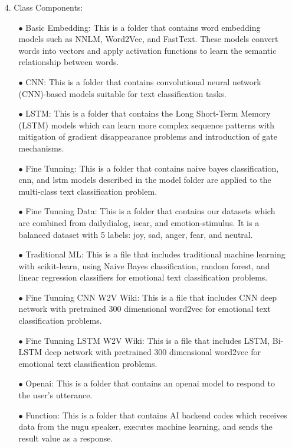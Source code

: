 \documentclass[conference]{IEEEtran}
\begin{document}
\begin{itemize}
\begin{table} [h]
\begin{tabular}{p{3cm}|p{3.5cm}|p{2cm}}
    \hline
    \end{tabular} 
\end{table}
    
    
    
    \item[4.]  Class Components: 
    \begin{itemize}
        \item[$\bullet$]Basic Embedding: This is a folder that contains word embedding models such as NNLM, Word2Vec, and FastText. These models convert words into vectors and apply activation functions to learn the semantic relationship between words.
        \item[$\bullet$]CNN: This is a folder that contains convolutional neural network (CNN)-based models suitable for text classification tasks.
        \item[$\bullet$]LSTM: This is a folder that contains the Long Short-Term Memory (LSTM) models which can learn more complex sequence patterns with mitigation of gradient disappearance problems and introduction of gate mechanisms.
        \item[$\bullet$]Fine Tunning: This is a folder that contains naive bayes classification, cnn, and lstm models described in the model folder are applied to the multi-class text classification problem.
        \item[$\bullet$]Fine Tunning Data: This is a folder that contains our datasets which are combined from dailydialog, isear, and emotion-stimulus. It is a balanced dataset with 5 labels: joy, sad, anger, fear, and neutral.
        \item[$\bullet$]Traditional ML: This is a file that includes traditional machine learning with scikit-learn, using Naive Bayes classification, random forest, and linear regression classifiers for emotional text classification problems.
        \item[$\bullet$]Fine Tunning CNN W2V Wiki: This is a file that includes CNN deep network with pretrained 300 dimensional word2vec for emotional text classification problems.
        \item[$\bullet$]Fine Tunning LSTM W2V Wiki: This is a file that includes LSTM, Bi-LSTM deep network with pretrained 300 dimensional word2vec for emotional text classification problems.
        \item[$\bullet$]Openai: This is a folder that contains an openai model to respond to the user's utterance.
        \item[$\bullet$]Function: This is a folder that contains AI backend codes which receives data from the nugu speaker, executes machine learning, and sends the result value as a response.




\end{itemize}
\end{itemize}
\end{document}
